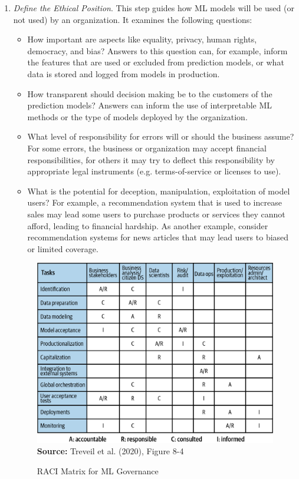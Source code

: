 \begin{enumerate}
\item \emph{Define the Ethical Position}. This step guides how ML models will be used (or not used) by an organization. It examines the following questions:
\begin{itemize}
  \item How important are aspects like equality, privacy, human rights, democracy, and bias? Answers to this question can, for example, inform the features that are used or excluded from prediction models, or what data is stored and logged from models in production. 
  \item How transparent should decision making be to the customers of the prediction models? Answers can inform the use of interpretable ML methods or the type of models deployed by the organization. 
  \item What level of responsibility for errors will or should the business assume? For some errors, the business or organization may accept financial responsibilities, for others it may try to deflect this responsibility by appropriate legal instruments (e.g. terms-of-service or licenses to use). 
  \item What is the potential for deception, manipulation, exploitation of model users? For example, a recommendation system that is used to increase sales may lead some users to purchase products or services they cannot afford, leading to financial hardship. As another example, consider recommendation systems for news articles that may lead users to biased or limited coverage. 
\end{itemize}

\begin{figure}
\centering
\includegraphics[width=.75\textwidth]{imlo_0806.png} \\

\scriptsize \textbf{Source:} Treveil et al. (2020), Figure 8-4
\caption{RACI Matrix for ML Governance}
\label{fig:mlraci}
\end{figure}


\end{enumerate}
